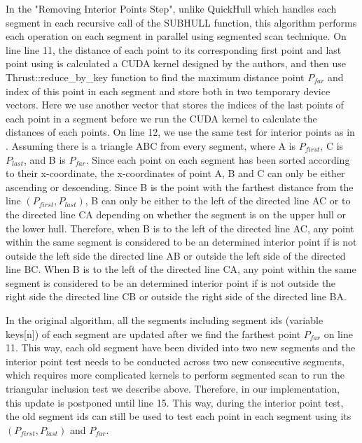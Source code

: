 \documentclass{article}
\begin{document}
In the "Removing Interior Points Step", unlike QuickHull \cite{blelloch1996parallel} which handles each segment in each recursive call of the SUBHULL \cite{blelloch1996parallel} function, this algorithm performs each operation on each segment in parallel using segmented scan technique. On line line 11, the distance of each point to its corresponding first point and last point using is calculated a CUDA kernel designed by the authors, and then use Thrust::reduce\_by\_key function to find the maximum distance point $P_{far}$ and index of this point in each segment and store both in two temporary device vectors. Here we use another vector that stores the indices of the last points of each point in a segment before we run the CUDA kernel to calculate the distances of each points. On line 12, we use the same test for interior points as in \cite{zhang2015novel}. Assuming there is a triangle ABC from every segment, where A is $P_{first}$, C is $P_{last}$, and B is $P_{far}$. Since each point on each segment has been sorted according to their x-coordinate, the x-coordinates of point A, B and C can only be either ascending or descending. Since B is the point with the farthest distance from the line $(P_{first},P_{last})$, B can only be either to the left of the directed line AC or to the directed line CA depending on whether the segment is on the upper hull or the lower hull. Therefore, when B is to the left of the directed line AC, any point within the same segment is considered to be an determined interior point if is not outside the left side the directed line AB or outside the left side of the directed line BC. When B is to the left of the directed line CA, any point within the same segment is considered to be an determined interior point if is not outside the right side the directed line CB or outside the right side of the directed line BA.

In the original algorithm, all the segments including segment ids (variable keys[n]) of each segment are updated after we find the farthest point $P_{far}$ on line 11. This way, each old segment have been divided into two new segments and the interior point test needs to be conducted across two new consecutive segments, which requires more complicated kernels to perform segmented scan to run the triangular inclusion test we describe above. Therefore, in our implementation, this update is postponed until line 15. This way, during the interior point test, the old segment ids can still be used to test each point in each segment using its $(P_{first},P_{last})$ and $P_{far}$. 
\end{document}
